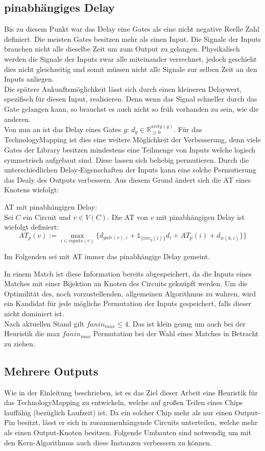 \documentclass[11pt, a4paper, german]{article}
\newcommand{\TM}{TechnologyMapping }
\begin{document}
\subsection{pinabhängiges Delay}
Bis zu diesem Punkt war das Delay eine Gates als eine nicht negative Reelle Zahl definiert. Die meisten Gates besitzen mehr als einen Input. Die Signale der Inputs brauchen nicht alle dieselbe Zeit um zum Output zu gelangen. Physikalisch werden die Signale der Inputs zwar alle miteinander verrechnet, jedoch geschieht dies nicht gleichzeitig und somit müssen nicht alle Signale zur selben Zeit an den Inputs anliegen.\\
Die spätere Ankunftsmöglichkeit lässt sich durch einen kleineren Delaywert, spezifisch für diesen Input, realisieren. Denn wenn das Signal schneller durch das Gate gelangen kann, so brauchst es auch nicht so früh vorhanden zu sein, wie die anderen. \\
Von nun an ist das Delay eines Gates $g$: $d_g \in \mathbb{R}_{\geq 0}^{arity(g)}$. Für das \TM ist dies eine weitere Möglichkeit der Verbesserung, denn viele Gates der Library besitzen mindestens eine Teilmenge von Inputs welche logisch symmetrisch aufgebaut sind. Diese lassen sich beliebig permutieren. Durch die unterschiedlichen Delay-Eigenschaften der Inputs kann eine solche Permutierung das Dealy des Outputs verbessern. Aus diesem Grund ändert sich die AT eines Knotens wiefolgt: 
\begin{definition}{AT mit pinabhängigen Delay:}\\
	Sei $C$ ein Circuit und $v \in V(C)$. Die AT von $v$ mit pinabhängigen Delay ist wiefolgt definiert: \[ AT_p(v) :=  \max\limits_{i \in inputs(v)} \{   d_{gate(v),i} + \mathbb{1}_{\{inv_g(i) \}} d_{i} + AT_p(i) + d_{w(k,i)} \}   \}\]
\end{definition}
Im Folgenden sei mit AT immer das pinabhängige Delay gemeint.

In einem Match ist diese Information bereits abgespeichert, da die Inputs eines Matches mit einer Bijektion an Knoten des Circuits geknüpft werden. Um die Optimilität des, noch vorzustellenden, allgemeinen Algorithmus zu wahren, wird ein Kandidat für jede mögliche Permutation der Inputs gespeichert, falls dieser nicht dominiert ist.\\
Nach aktuellen Stand gilt $fanin_{max} \leq 4$. Das ist klein genug um auch bei der Heuristik die max $fanin_{max}$ Permutation bei der Wahl eines Matches in Betracht zu ziehen. 

\subsection{Mehrere Outputs}
Wie in der Einleitung beschrieben, ist es das Ziel dieser Arbeit eine Heuristik für das \TM zu entwickeln, welche auf großen Teilen eines Chips lauffähig (bezüglich Laufzeit) ist. Da ein solcher Chip mehr als nur einen Output-Pin besitzt, lässt er sich in zusammenhängende Circuits unterteilen, welche mehr als einen Output-Knoten besitzen. Folgende Umbauten sind notwendig um mit den Kern-Algorithmus auch diese Instanzen verbessern zu können.\\
\end{document}
